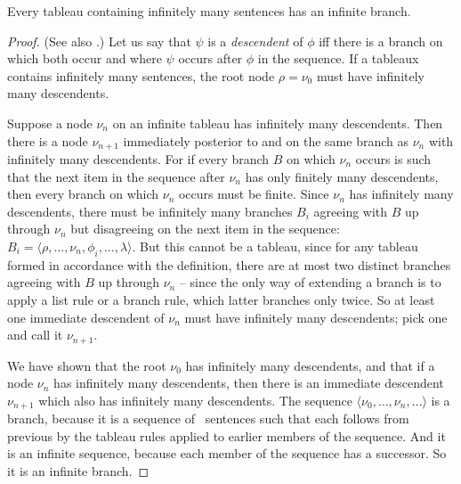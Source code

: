 \begin{lemma}\label{konig}
	Every tableau containing infinitely many sentences has an infinite branch. \begin{proof} (See also \citet[152]{bevpospa}.) Let us say that $\psi$ is a \emph{descendent} of $\phi$ iff there is a branch on which both occur and where $\psi$ occurs after $\phi$ in the sequence. If a tableaux contains infinitely many sentences, the root node $\rho=\nu_{0}$ must have infinitely many descendents. 

	Suppose a node $\nu_{n}$ on an infinite tableau has infinitely many descendents. Then there is a node $\nu_{n+1}$ immediately posterior to and on the same branch as $\nu_{n}$ with infinitely many descendents. For if every branch $B$ on which $\nu_{n}$ occurs is such that the next item in the sequence after $\nu_{n}$ has only finitely many descendents, then every branch on which $\nu_{n}$ occurs must be finite. Since $\nu_{n}$ has infinitely many descendents, there must be infinitely many branches $B_{i}$ agreeing with $B$ up through $\nu_{n}$ but disagreeing on the next item in the sequence: $B_{i} = \langle \rho,…,\nu_{n},\phi_{i},…,\lambda\rangle$. But this cannot be a tableau, since for any tableau formed in accordance with the definition, there are at most two distinct branches agreeing with $B$ up through $\nu_{n}$ – since the only way of extending a branch is to apply a list rule or a branch rule, which latter branches only twice. So at least one immediate descendent of $\nu_{n}$ must have infinitely many descendents; pick one and call it $\nu_{n+1}$.

	We have shown that the root $\nu_{0}$ has infinitely many descendents, and that if a node $\nu_{n}$ has infinitely many descendents, then there is an immediate descendent $\nu_{n+1}$ which also has infinitely many descendents. The sequence $\langle \nu_{0},…,\nu_{n},…\rangle$ is a branch, because it is a sequence of \lone\ sentences such that each follows from previous by the tableau rules applied to earlier members of the sequence. And it is an infinite sequence, because each member of the sequence has a successor. So it is an infinite branch.
	\end{proof}
\end{lemma}

